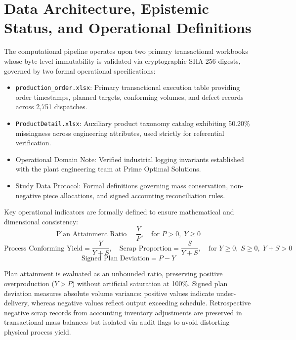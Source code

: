

\section{Data Architecture, Epistemic Status, and Operational Definitions}
\label{sec:data_definitions}

The computational pipeline operates upon two primary transactional workbooks whose byte-level immutability is validated via cryptographic SHA-256 digests, governed by two formal operational specifications:
\begin{itemize}
    \item \texttt{production\_order.xlsx}: Primary transactional execution table providing order timestamps, planned targets, conforming volumes, and defect records across 2{,}751 dispatches.
    \item \texttt{ProductDetail.xlsx}: Auxiliary product taxonomy catalog exhibiting 50.20\% missingness across engineering attributes, used strictly for referential verification.
    \item Operational Domain Note: Verified industrial logging invariants established with the plant engineering team at Prime Optimal Solutions.
    \item Study Data Protocol: Formal definitions governing mass conservation, non-negative piece allocations, and signed accounting reconciliation rules.
\end{itemize}




Key operational indicators are formally defined to ensure mathematical and dimensional consistency:
\begin{equation}
\text{Plan Attainment Ratio} = \frac{Y}{P}, \quad \text{for } P > 0, \; Y \ge 0
\end{equation}
\begin{equation}
\text{Process Conforming Yield} = \frac{Y}{Y + S}, \quad \text{Scrap Proportion} = \frac{S}{Y + S}, \quad \text{for } Y \ge 0, \; S \ge 0, \; Y + S > 0
\end{equation}
\begin{equation}
\text{Signed Plan Deviation} = P - Y
\end{equation}

Plan attainment is evaluated as an unbounded ratio, preserving positive overproduction ($Y > P$) without artificial saturation at 100\%. Signed plan deviation measures absolute volume variance: positive values indicate under-delivery, whereas negative values reflect output exceeding schedule. Retrospective negative scrap records from accounting inventory adjustments are preserved in transactional mass balances but isolated via audit flags to avoid distorting physical process yield.

